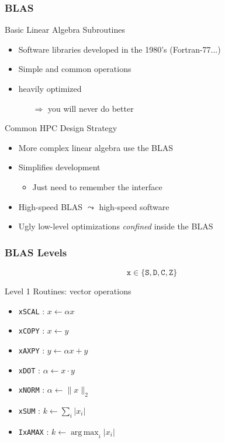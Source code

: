 \documentclass[xcolor={rgb,x11names,svgnames},rgb,x11names,svgnames]{beamer}
\DeclareMathOperator*{\argmax}{arg\,max}
\newcommand{\red}{\alert}
\begin{document}
\begin{frame}[label=blas]
  \frametitle{BLAS}

  
  \begin{block}{Basic Linear Algebra Subroutines}
    \begin{itemize}
    \item Software libraries developed in the 1980's (Fortran-77...)
    \item \red{Simple} and \red{common} operations
    \item \red{heavily optimized}
      \begin{itemize}
      \item[$\Rightarrow$] you will never do better
      \end{itemize}
    \end{itemize}
  \end{block}

  \begin{exampleblock}{Common HPC Design Strategy}
    \begin{itemize}
    \item More complex linear algebra use the BLAS
    \item Simplifies development
      \begin{itemize}
      \item Just need to remember the interface
      \end{itemize}
    \item High-speed BLAS $\leadsto$ high-speed software
    \item Ugly low-level optimizations \emph{confined} inside the BLAS
    \end{itemize}
  \end{exampleblock}  
\end{frame}


\begin{frame}[label=blas]
  \frametitle{BLAS Levels}

  \[
    \texttt{x} \in \{ \texttt{S}, \texttt{D}, \texttt{C}, \texttt{Z} \}
  \]
  
  \begin{block}{Level 1 Routines: \red{vector} operations}
    \begin{itemize}
    \item \texttt{xSCAL} : $x \gets \alpha x$
    \item \texttt{xCOPY} : $x \gets y$
    \item \texttt{xAXPY} : $y \gets \alpha x + y$
    \item \texttt{xDOT} : $\alpha \gets x \cdot y$
    \item \texttt{xNORM} : $\alpha \gets \| x \|_2$
    \item \texttt{xSUM} : $k \gets \sum_i | x_i |$
    \item \texttt{IxAMAX} : $k \gets \argmax_i | x_i |$
    \end{itemize}
  \end{block}
\end{frame}
\end{document}
